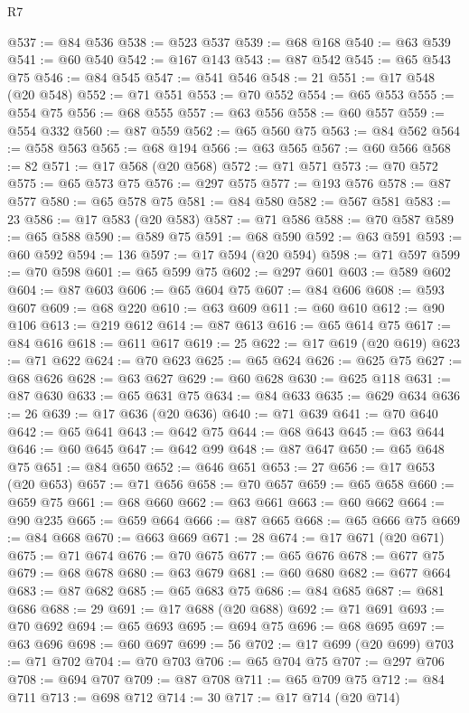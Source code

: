 \begin{lexlean}{R7}
\begin{coremodule}
@537 := @84 @536
@538 := @523 @537
@539 := @68 @168
@540 := @63 @539
@541 := @60 @540
@542 := @167 @143
@543 := @87 @542
@545 := @65 @543 @75
@546 := @84 @545
@547 := @541 @546
@548 := 21
@551 := @17 @548 (@20 @548)
@552 := @71 @551
@553 := @70 @552
@554 := @65 @553
@555 := @554 @75
@556 := @68 @555
@557 := @63 @556
@558 := @60 @557
@559 := @554 @332
@560 := @87 @559
@562 := @65 @560 @75
@563 := @84 @562
@564 := @558 @563
@565 := @68 @194
@566 := @63 @565
@567 := @60 @566
@568 := 82
@571 := @17 @568 (@20 @568)
@572 := @71 @571
@573 := @70 @572
@575 := @65 @573 @75
@576 := @297 @575
@577 := @193 @576
@578 := @87 @577
@580 := @65 @578 @75
@581 := @84 @580
@582 := @567 @581
@583 := 23
@586 := @17 @583 (@20 @583)
@587 := @71 @586
@588 := @70 @587
@589 := @65 @588
@590 := @589 @75
@591 := @68 @590
@592 := @63 @591
@593 := @60 @592
@594 := 136
@597 := @17 @594 (@20 @594)
@598 := @71 @597
@599 := @70 @598
@601 := @65 @599 @75
@602 := @297 @601
@603 := @589 @602
@604 := @87 @603
@606 := @65 @604 @75
@607 := @84 @606
@608 := @593 @607
@609 := @68 @220
@610 := @63 @609
@611 := @60 @610
@612 := @90 @106
@613 := @219 @612
@614 := @87 @613
@616 := @65 @614 @75
@617 := @84 @616
@618 := @611 @617
@619 := 25
@622 := @17 @619 (@20 @619)
@623 := @71 @622
@624 := @70 @623
@625 := @65 @624
@626 := @625 @75
@627 := @68 @626
@628 := @63 @627
@629 := @60 @628
@630 := @625 @118
@631 := @87 @630
@633 := @65 @631 @75
@634 := @84 @633
@635 := @629 @634
@636 := 26
@639 := @17 @636 (@20 @636)
@640 := @71 @639
@641 := @70 @640
@642 := @65 @641
@643 := @642 @75
@644 := @68 @643
@645 := @63 @644
@646 := @60 @645
@647 := @642 @99
@648 := @87 @647
@650 := @65 @648 @75
@651 := @84 @650
@652 := @646 @651
@653 := 27
@656 := @17 @653 (@20 @653)
@657 := @71 @656
@658 := @70 @657
@659 := @65 @658
@660 := @659 @75
@661 := @68 @660
@662 := @63 @661
@663 := @60 @662
@664 := @90 @235
@665 := @659 @664
@666 := @87 @665
@668 := @65 @666 @75
@669 := @84 @668
@670 := @663 @669
@671 := 28
@674 := @17 @671 (@20 @671)
@675 := @71 @674
@676 := @70 @675
@677 := @65 @676
@678 := @677 @75
@679 := @68 @678
@680 := @63 @679
@681 := @60 @680
@682 := @677 @664
@683 := @87 @682
@685 := @65 @683 @75
@686 := @84 @685
@687 := @681 @686
@688 := 29
@691 := @17 @688 (@20 @688)
@692 := @71 @691
@693 := @70 @692
@694 := @65 @693
@695 := @694 @75
@696 := @68 @695
@697 := @63 @696
@698 := @60 @697
@699 := 56
@702 := @17 @699 (@20 @699)
@703 := @71 @702
@704 := @70 @703
@706 := @65 @704 @75
@707 := @297 @706
@708 := @694 @707
@709 := @87 @708
@711 := @65 @709 @75
@712 := @84 @711
@713 := @698 @712
@714 := 30
@717 := @17 @714 (@20 @714)

\end{coremodule}
\end{lexlean}
